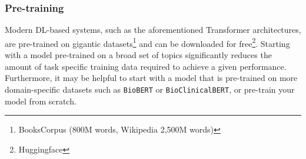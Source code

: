 \subsubsection{Pre-training}
Modern DL-based systems, such as the aforementioned Transformer architectures, are pre-trained on gigantic datasets\footnote{BooksCorpus (800M words, Wikipedia 2,500M words)}\cite{bertpaper} and can be downloaded for free\footnote{Huggingface}.
Starting with a model pre-trained on a broad set of topics significantly reduces the amount of task specific training data required to achieve a given performance.
Furthermore, it may be helpful to start with a model that is pre-trained on more domain-specific datasets such as \texttt{BioBERT\cite{DBLP:journals/corr/abs-1901-08746}} or \texttt{Bio\textunderscore ClinicalBERT\cite{clinicalbert}}, or pre-train your model from scratch.

